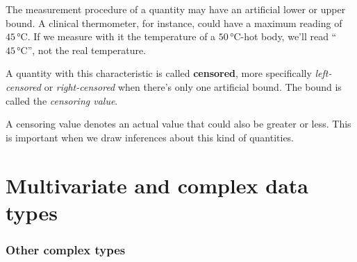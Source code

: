 \documentclass[
  a4paper,
  DIV=11,
  numbers=noendperiod,
  oneside]{scrreprt}
\begin{document}
The measurement procedure of a quantity may have an artificial lower or
upper bound. A clinical thermometer, for instance, could have a maximum
reading of \(45\,\mathrm{°C}\). If we measure with it the temperature of
a \(50\,\mathrm{°C}\)-hot body, we'll read {``\(45\,\mathrm{°C}\)'',}
not the real temperature.

A quantity with this characteristic is called {\textbf{censored}}, more
specifically \emph{left-censored} or \emph{right-censored} when there's
only one artificial bound. The bound is called the \emph{censoring
value}.

A censoring value denotes an actual value that could also be greater or
less. This is important when we draw inferences about this kind of
quantities.

\hypertarget{sec-data-types-multi}{%
\chapter{Multivariate and complex data
types}\label{sec-data-types-multi}}

\providecommand{\ul}{\uline}
\renewcommand*{\|}[1][]{\nonscript\:#1\vert\nonscript\:\mathopen{}}
\providecommand*{\pr}[1]{\textsf{\small`#1'}}
\renewcommand*{\pr}[1]{\textsf{\small`#1'}}
\providecommand*{\prq}[1]{\textsf{\small #1}}

\providecommand{\se}[1]{\mathsfit{#1}}
\renewcommand{\se}[1]{\mathsfit{#1}}
\providecommand{\p}{\mathrm{p}}
\renewcommand{\p}{\mathrm{p}}
\renewcommand{\P}{\mathrm{P}}

\providecommand*{\mo}[1][=]{\mathord{\,#1\,}}
\providecommand*{\yX}{\se{X}}
\providecommand*{\yY}{\se{Y}}
\providecommand*{\yI}{\se{I}}
\providecommand{\di}{\mathrm{d}}

\hypertarget{other-complex-types}{%
\subsection{Other complex types}\label{other-complex-types}}
\end{document}

